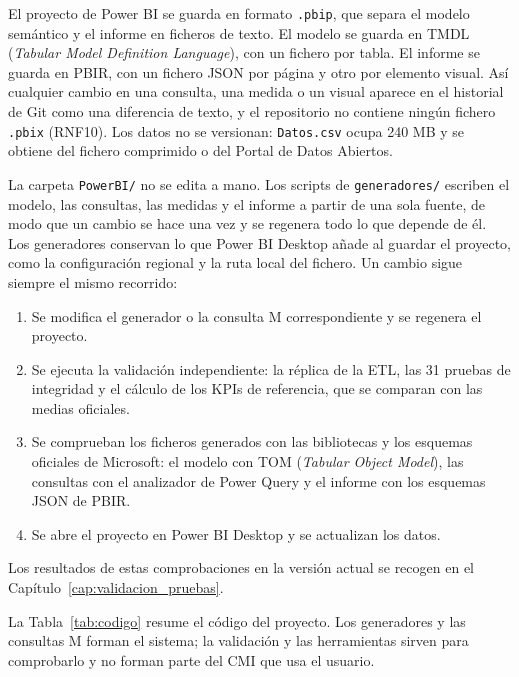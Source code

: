\documentclass[12pt, a4paper, oneside]{report}
\begin{document}
El proyecto de Power BI se guarda en formato \texttt{.pbip}, que separa el modelo semántico y el informe en ficheros de texto. El modelo se guarda en TMDL (\textit{Tabular Model Definition Language}), con un fichero por tabla. El informe se guarda en PBIR, con un fichero JSON por página y otro por elemento visual. Así cualquier cambio en una consulta, una medida o un visual aparece en el historial de Git como una diferencia de texto, y el repositorio no contiene ningún fichero \texttt{.pbix} (RNF10). Los datos no se versionan: \texttt{Datos.csv} ocupa 240 MB y se obtiene del fichero comprimido o del Portal de Datos Abiertos.

La carpeta \texttt{PowerBI/} no se edita a mano. Los scripts de \texttt{generadores/} escriben el modelo, las consultas, las medidas y el informe a partir de una sola fuente, de modo que un cambio se hace una vez y se regenera todo lo que depende de él. Los generadores conservan lo que Power BI Desktop añade al guardar el proyecto, como la configuración regional y la ruta local del fichero. Un cambio sigue siempre el mismo recorrido:
\begin{enumerate}
    \item Se modifica el generador o la consulta M correspondiente y se regenera el proyecto.
    \item Se ejecuta la validación independiente: la réplica de la ETL, las 31 pruebas de integridad y el cálculo de los KPIs de referencia, que se comparan con las medias oficiales.
    \item Se comprueban los ficheros generados con las bibliotecas y los esquemas oficiales de Microsoft: el modelo con TOM (\textit{Tabular Object Model}), las consultas con el analizador de Power Query y el informe con los esquemas JSON de PBIR.
    \item Se abre el proyecto en Power BI Desktop y se actualizan los datos.
\end{enumerate}

Los resultados de estas comprobaciones en la versión actual se recogen en el Capítulo~\ref{cap:validacion_pruebas}.

La Tabla~\ref{tab:codigo} resume el código del proyecto. Los generadores y las consultas M forman el sistema; la validación y las herramientas sirven para comprobarlo y no forman parte del CMI que usa el usuario.
\end{document}
